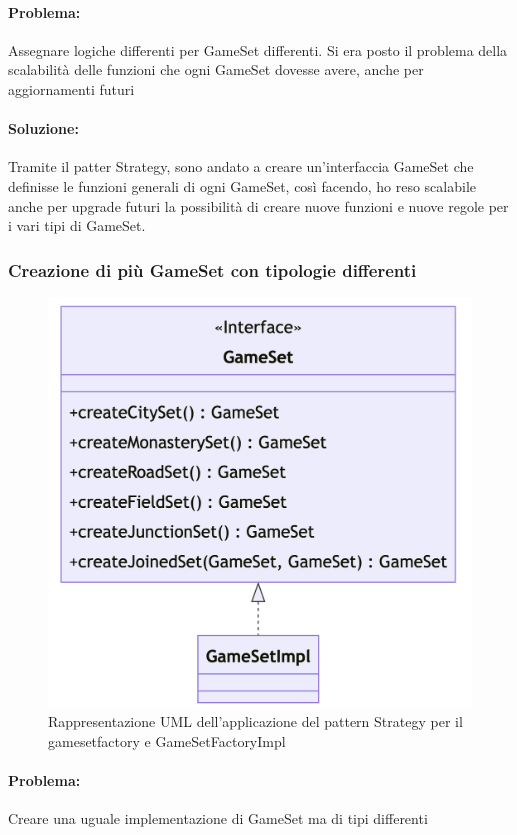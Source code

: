 \paragraph{Problema:}
Assegnare logiche differenti per GameSet differenti. Si era posto il problema della scalabilità delle funzioni che ogni GameSet dovesse avere, anche per aggiornamenti futuri
\paragraph{Soluzione:}
Tramite il patter Strategy, sono andato a creare un'interfaccia GameSet che definisse le funzioni generali di ogni GameSet, così facendo, ho reso scalabile anche per upgrade futuri la possibilità di creare nuove funzioni e nuove regole per i vari tipi di GameSet.

\subsubsection*{Creazione di più GameSet con tipologie differenti}
\begin{figure}[ht]
    \centering\includegraphics[scale=.3]{images/gamesetfactory.png}
    \caption{Rappresentazione UML dell'applicazione del pattern Strategy per il gamesetfactory e GameSetFactoryImpl}
\end{figure}

\paragraph{Problema:}
Creare una uguale implementazione di GameSet ma di tipi differenti
